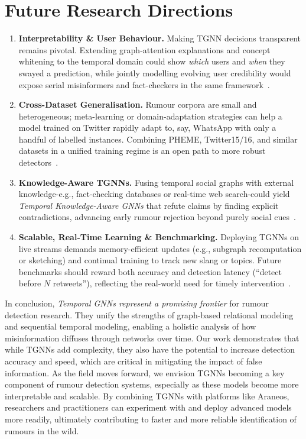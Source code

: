 \documentclass{cshonours}
\begin{document}
\section{Future Research Directions}

\begin{enumerate}
    \item \textbf{Interpretability \& User Behaviour.}  Making TGNN decisions transparent remains pivotal.  Extending graph-attention explanations and concept whitening to the temporal domain could show \emph{which} users and \emph{when} they swayed a prediction, while jointly modelling evolving user credibility would expose serial misinformers and fact-checkers in the same framework~\cite{rahman2024primer}.

    \item \textbf{Cross-Dataset Generalisation.}  Rumour corpora are small and heterogeneous; meta-learning or domain-adaptation strategies can help a model trained on Twitter rapidly adapt to, say, WhatsApp with only a handful of labelled instances.  Combining PHEME, Twitter15/16, and similar datasets in a unified training regime is an open path to more robust detectors~\cite{Wang2025Challenging}.

    \item \textbf{Knowledge-Aware TGNNs.}  Fusing temporal social graphs with external knowledge-e.g., fact-checking databases or real-time web search-could yield \emph{Temporal Knowledge-Aware GNNs} that refute claims by finding explicit contradictions, advancing early rumour rejection beyond purely social cues~\cite{Song2021FakeNews}.

    \item \textbf{Scalable, Real-Time Learning \& Benchmarking.}  Deploying TGNNs on live streams demands memory-efficient updates (e.g., subgraph recomputation or sketching) and continual training to track new slang or topics.  Future benchmarks should reward both accuracy and detection latency (``detect before $N$ retweets''), reflecting the real-world need for timely intervention~\cite{gao2024simple}.
\end{enumerate}



In conclusion, \emph{Temporal GNNs represent a promising frontier} for rumour detection research. They unify the strengths of graph-based relational modeling and sequential temporal modeling, enabling a holistic analysis of how misinformation diffuses through networks over time. Our work demonstrates that while TGNNs add complexity, they also have the potential to increase detection accuracy and speed, which are critical in mitigating the impact of false information. As the field moves forward, we envision TGNNs becoming a key component of rumour detection systems, especially as these models become more interpretable and scalable. By combining TGNNs with platforms like Araneos, researchers and practitioners can experiment with and deploy advanced models more readily, ultimately contributing to faster and more reliable identification of rumours in the wild.
\end{document}
